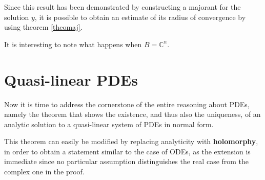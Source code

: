 Since this result has been demonstrated by constructing a majorant for the solution $y$, it is possible to obtain an estimate of its radius of convergence by using theorem \ref{theomaj}.

\begin{theorem}
\end{theorem}

\begin{remark}
It is interesting to note what happens when $B=\mathbb{C}^n$.
\end{remark}


\newpage
\section{Quasi-linear PDEs}

Now it is time to address the cornerstone of the entire reasoning about PDEs, namely the theorem that shows the existence, and thus also the uniqueness, of an analytic solution to a quasi-linear system of PDEs in normal form.

\begin{theorem}\label{teoquasilin}
\end{theorem}

\begin{remark}
This theorem can easily be modified by replacing analyticity with \textbf{holomorphy}, in order to obtain a statement similar to the case of ODEs, as the extension is immediate since no particular assumption distinguishes the real case from the complex one in the proof.
\end{remark}

